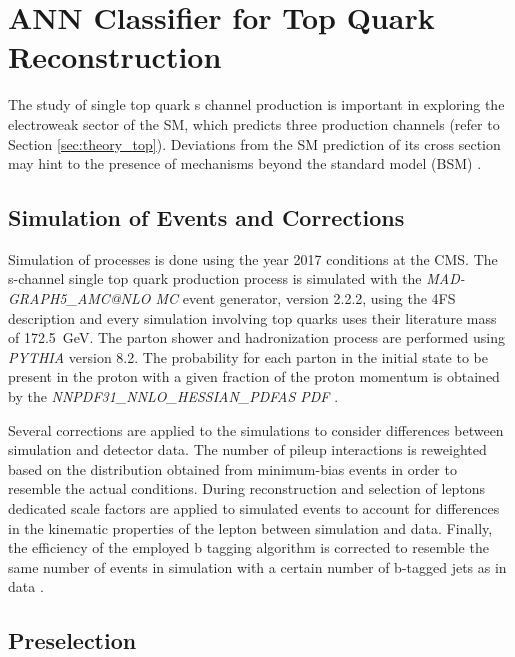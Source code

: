\chapter{ANN Classifier for Top Quark Reconstruction}
\label{ch:classifier}
The study of single top quark s channel production is important in exploring the electroweak sector of the SM, which predicts three production channels (refer to Section \ref{sec:theory_top}). Deviations from the SM prediction of its cross section may hint to the presence of mechanisms beyond the standard model (BSM) \cite{CMS16}.

\section{Simulation of Events and Corrections}
Simulation of processes is done using the year 2017 conditions at the CMS. The s-channel single top quark production process is simulated with the \emph{MAD-GRAPH5\_AMC@NLO MC} event generator, version 2.2.2, using the 4FS description \cite{Fal18} and every simulation involving top quarks uses their literature mass of \SI{172.5}{GeV}. The parton shower and hadronization process are performed using \emph{PYTHIA} version 8.2. The probability for each parton in the initial state to be present in the proton with a given fraction of the proton momentum is obtained by the \emph{NNPDF31\_NNLO\_HESSIAN\_PDFAS PDF} \cite{Fal18}.

Several corrections are applied to the simulations to consider differences between simulation and detector data. The number of pileup interactions is reweighted based on the distribution obtained from minimum-bias events in order to resemble the actual conditions. During reconstruction and selection of leptons dedicated scale factors are applied to simulated events to account for differences in the kinematic properties of the lepton between simulation and data. Finally, the efficiency of the employed b tagging algorithm is corrected to resemble the same number of events in simulation with a certain number of b-tagged jets as in data \cite{Fal18}.

\section{Preselection}

